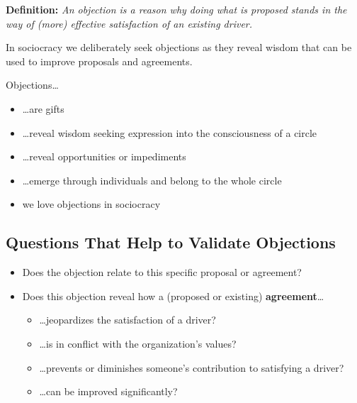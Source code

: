 \textbf{Definition:} \emph{An objection is a reason why doing what is proposed stands in the way of (more) effective satisfaction of an existing driver.}

In sociocracy we deliberately seek objections as they reveal
wisdom that can be used to improve proposals and agreements.

Objections{\ldots}

\begin{itemize}
\item {\ldots}are gifts

\item {\ldots}reveal wisdom seeking expression into the consciousness of a circle

\item {\ldots}reveal opportunities or impediments

\item {\ldots}emerge through individuals and belong to the whole circle

\item we love objections in sociocracy

\end{itemize}

\subsection{Questions That Help to Validate Objections}
\label{questionsthathelptovalidateobjections}

\begin{itemize}
\item Does the objection relate to this specific proposal or agreement?

\item Does this objection reveal how a (proposed or existing) \textbf{agreement}{\ldots}

\begin{itemize}
\item {\ldots}jeopardizes the satisfaction of a driver?

\item {\ldots}is in conflict with the organization's values?

\item {\ldots}prevents or diminishes someone's contribution to satisfying a driver?

\item {\ldots}can be improved significantly?

\end{itemize}

\end{itemize}

